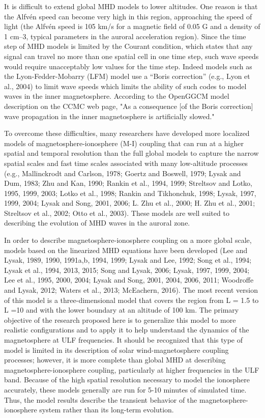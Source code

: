 \documentclass[draft,linenumbers]{agujournal}
\begin{document}
It is difficult to extend global MHD models to lower altitudes.  One reason is that the Alfvén speed can become very high in this region, approaching the speed of light (the Alfvén speed is 105 km/s for a magnetic field of 0.05 G and a density of 1 cm–3, typical parameters in the auroral acceleration region).  Since the time step of MHD models is limited by the Courant condition, which states that any signal can travel no more than one spatial cell in one time step, such wave speeds would require unacceptably low values for the time step.  Indeed models such as the Lyon-Fedder-Mobarry (LFM) model use a ``Boris correction'' (e.g., Lyon et al., 2004) to limit wave speeds which limits the ability of such codes to model waves in the inner magnetosphere.  According to the OpenGGCM model description on the CCMC web page, "As a consequence [of the Boris correction] wave propagation in the inner magnetosphere is artificially slowed."

To overcome these difficulties, many researchers have developed more localized models of magnetosphere-ionosphere (M-I) coupling that can run at a higher spatial and temporal resolution than the full global models to capture the narrow spatial scales and fast time scales associated with many low-altitude processes (e.g., Mallinckrodt and Carlson, 1978; Goertz and Boswell, 1979; Lysak and Dum, 1983; Zhu and Kan, 1990; Rankin et al., 1994, 1999; Streltsov and Lotko, 1995, 1999, 2003; Lotko et al., 1998; Rankin and Tikhonchuk, 1998; Lysak, 1997, 1999, 2004; Lysak and Song, 2001, 2006; L. Zhu et al., 2000; H. Zhu et al., 2001; Streltsov et al., 2002; Otto et al., 2003).  These models are well suited to describing the evolution of MHD waves in the auroral zone.

In order to describe magnetosphere-ionosphere coupling on a more global scale, models based on the linearized MHD equations have been developed (Lee and Lysak, 1989, 1990, 1991a,b, 1994, 1999; Lysak and Lee, 1992; Song et al., 1994; Lysak et al., 1994, 2013, 2015; Song and Lysak, 2006; Lysak, 1997, 1999, 2004; Lee et al., 1995, 2000, 2004; Lysak and Song, 2001, 2004, 2006, 2011; Woodroffe and Lysak, 2012; Waters et al., 2013; McEachern, 2016).  The most recent version of this model is a three-dimensional model that covers the region from L = 1.5 to L =10 and with the lower boundary at an altitude of 100 km. The primary objective of the research proposed here is to generalize this model to more realistic configurations and to apply it to help understand the dynamics of the magnetosphere at ULF frequencies.  It should be recognized that this type of model is limited in its description of solar wind-magnetosphere coupling processes; however, it is more complete than global MHD at describing magnetosphere-ionosphere coupling, particularly at higher frequencies in the ULF band.  Because of the high spatial resolution necessary to model the ionosphere accurately, these models generally are run for 5-10 minutes of simulated time.  Thus, the model results describe the transient behavior of the magnetosphere-ionosphere system rather than its long-term evolution.
\end{document}
